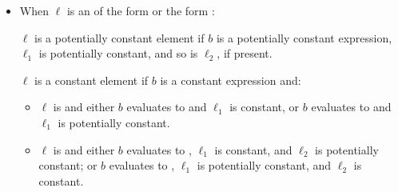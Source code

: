 \documentclass[makeidx]{article}
\begin{document}
{\begin{itemize}
  Moreover, $\ell$ is a constant element if it is `',
  where $e$ is a constant expression that evaluates
  to the null object.
\item
  When $\ell$ is an 
  of the form
  or the form
  :

  $\ell$ is a potentially constant element
  if $b$ is a potentially constant expression,
  $\ell_1$ is potentially constant,
  and so is $\ell_2$, if present.

  $\ell$ is a constant element if $b$ is a constant expression
  and:

  \begin{itemize}
  \item
    $\ell$ is  and
    either $b$ evaluates to \TRUE{} and $\ell_1$ is constant,
    or $b$ evaluates to \FALSE{} and $\ell_1$ is potentially constant.
  \item
    $\ell$ is  and
    either $b$ evaluates to \TRUE,
    $\ell_1$ is constant,
    and $\ell_2$ is potentially constant;
    or $b$ evaluates to \FALSE,
    $\ell_1$ is potentially constant,
    and $\ell_2$ is constant.
  \end{itemize}
\end{itemize}


}
\end{document}
